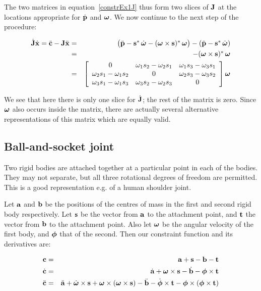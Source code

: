 The two matrices in equation~\ref{constrEx1J} thus form two slices of $\m{J}$ at
the locations appropriate for $\dot{\ve{p}}$ and $\ve{\omega}$. We now continue to the
next step of the procedure:

\begin{eqnarray}
\dot{\m{J}}\dot{\ve{x}} = 
\ddot{\ve{c}} - \m{J}\ddot{\ve{x}} &=&
    \big(\ddot{\ve{p}} - \dual{\ve{s}}\,\dot{\ve{\omega}} -
    \dual{(\ve{\omega}\times\ve{s})}\,\ve{\omega}\big) -
    (\ddot{\ve{p}} - \dual{\ve{s}}\,\dot{\ve{\omega}}) \nonumber\\
& = & -\dual{(\ve{\omega}\times\ve{s})}\,\ve{\omega} \nonumber\\
& = & \left[\begin{array}{ccc} 0 &
    \omega_1 s_2 - \omega_2 s_1 &
    \omega_1 s_3 - \omega_3 s_1 \\
    \omega_2 s_1 - \omega_1 s_2 & 0 &
    \omega_2 s_3 - \omega_3 s_2 \\
    \omega_3 s_1 - \omega_1 s_3 &
    \omega_3 s_2 - \omega_2 s_3 & 0
    \end{array}\right] \ve{\omega} \nonumber\\\label{constrEx1JDot}
\end{eqnarray}

We see that here there is only one slice for $\dot{\m{J}}$; the rest of the matrix
is zero. Since $\ve{\omega}$ also occurs inside the matrix, there are actually several
alternative representations of this matrix which are equally valid.

\subsection{Ball-and-socket joint\label{constrJoint}}

Two rigid bodies are attached together at a particular point in each of the bodies.
They may not separate, but all three rotational degrees of freedom are permitted. This is
a good representation e.g. of a human shoulder joint.

Let $\ve{a}$ and $\ve{b}$ be the positions of the centres of mass in the first and
second rigid body respectively. Let $\ve{s}$ be the vector from $\ve{a}$ to the 
attachment point, and $\ve{t}$ the vector from $\ve{b}$ to the attachment point.
Also let $\ve{\omega}$ be the angular velocity of the first body, and $\ve{\phi}$ that
of the second. Then our constraint function and its derivatives are:

\begin{eqnarray}
\ve{c} &=& \ve{a} + \ve{s} - \ve{b} - \ve{t} \\
\dot{\ve{c}} &=& \dot{\ve{a}} + \ve{\omega}\times\ve{s} -
    \dot{\ve{b}} - \ve{\phi}\times\ve{t} \\
\ddot{\ve{c}} &=& \ddot{\ve{a}} + \dot{\ve{\omega}}\times\ve{s} +
    \ve{\omega}\times(\ve{\omega}\times\ve{s}) -
    \ddot{\ve{b}} - \dot{\ve{\phi}}\times\ve{t} -
    \ve{\phi}\times(\ve{\phi}\times\ve{t})
\end{eqnarray}

